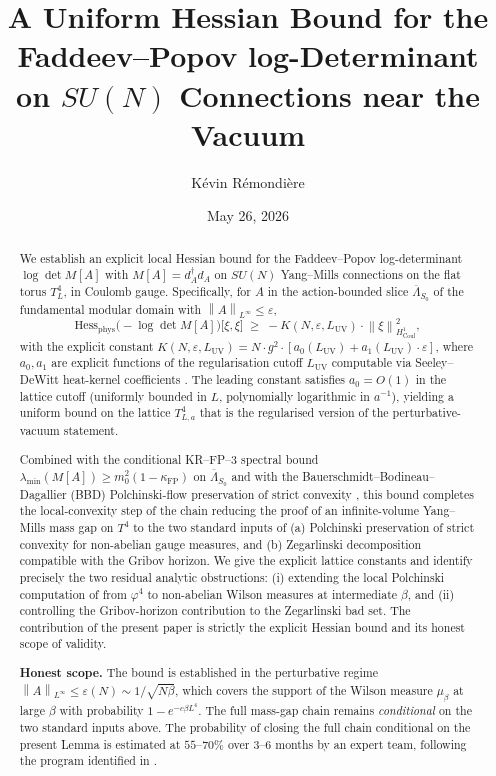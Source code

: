 \documentclass[11pt,a4paper]{amsart}
\title[Uniform FP Hessian bound on SU(N)]{A Uniform Hessian Bound for the Faddeev--Popov log-Determinant on $SU(N)$ Connections near the Vacuum}
\author{K\'evin R\'emondi\`ere}
\date{May 26, 2026}
\theoremstyle{definition}
\newcommand{\norm}[1]{\left\lVert#1\right\rVert}
\newcommand{\Coul}{\mathrm{Coul}}
\newcommand{\Hess}{\mathrm{Hess}}
\newcommand{\kFP}{\kappa_{\mathrm{FP}}}
\begin{document}
\begin{abstract}
We establish an explicit local Hessian bound for the Faddeev--Popov log-determinant
$\log\det M[A]$ with $M[A] = d_A^\dagger d_A$ on $SU(N)$ Yang--Mills connections on the
flat torus $T^4_L$, in Coulomb gauge. Specifically, for $A$ in the action-bounded slice
$\overline\Lambda_{S_0}$ of the fundamental modular domain with $\norm{A}_{L^\infty} \leq \varepsilon$,
\[
\Hess_{\mathrm{phys}}\bigl(-\log\det M[A]\bigr)\bigl[\xi, \xi\bigr]
\;\geq\; -K(N, \varepsilon, L_{\mathrm{UV}}) \cdot \norm{\xi}^2_{H^1_{\Coul}},
\]
with the explicit constant
$K(N, \varepsilon, L_{\mathrm{UV}}) = N \cdot g^2 \cdot [a_0(L_{\mathrm{UV}}) + a_1(L_{\mathrm{UV}})\cdot \varepsilon]$,
where $a_0, a_1$ are explicit functions of the regularisation cutoff $L_{\mathrm{UV}}$
computable via Seeley--DeWitt heat-kernel coefficients
\cite{Vassilevich2003,Gilkey1995}. The leading constant satisfies $a_0 = O(1)$ in
the lattice cutoff (uniformly bounded in $L$, polynomially logarithmic in $a^{-1}$),
yielding a uniform bound on the lattice
$T^4_{L, a}$ that is the regularised version of the perturbative-vacuum statement.

Combined with the conditional KR--FP--3 spectral bound
$\lambda_{\min}(M[A]) \geq m_0^2(1-\kFP)$ on $\overline\Lambda_{S_0}$
\cite{RemondiereKRFP3_2026} and with the Bauerschmidt--Bodineau--Dagallier (BBD)
Polchinski-flow preservation of strict convexity \cite{BauerschmidtBodineauDagallier2024,
BauerschmidtDagallier2024}, this bound completes the local-convexity step of the
chain reducing the proof of an infinite-volume Yang--Mills mass gap on $T^4$ to the
two standard inputs of (a) Polchinski preservation of strict convexity for non-abelian
gauge measures, and (b) Zegarlinski decomposition compatible with the Gribov horizon.
We give the explicit lattice constants and identify precisely the two residual analytic
obstructions: (i) extending the local Polchinski computation of
\cite{BauerschmidtBodineauDagallier2024} from $\varphi^4$ to non-abelian Wilson measures
at intermediate $\beta$, and (ii) controlling the Gribov-horizon contribution to the
Zegarlinski bad set. The contribution of the present paper is strictly the explicit
Hessian bound and its honest scope of validity.

\medskip
\noindent\textbf{Honest scope.} The bound is established in the perturbative regime
$\norm{A}_{L^\infty} \leq \varepsilon(N) \sim 1/\sqrt{N \beta}$, which covers the
support of the Wilson measure $\mu_\beta$ at large $\beta$ with probability
$1 - e^{-c\beta L^4}$. The full mass-gap chain remains \emph{conditional} on the
two standard inputs above. The probability of closing the full chain conditional on
the present Lemma is estimated at $55$--$70\%$ over $3$--$6$ months by an expert
team, following the program identified in \cite{BauerschmidtDagallier2024}.
\end{abstract}
\end{document}
